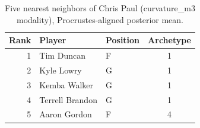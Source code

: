 \begin{table}[htbp]
  \centering\small
  \begin{tabular}{rllc}
    \toprule
    Rank & Player & Position & Archetype \\
    \midrule
    1 & Tim Duncan & F & 1 \\
    2 & Kyle Lowry & G & 1 \\
    3 & Kemba Walker & G & 1 \\
    4 & Terrell Brandon & G & 1 \\
    5 & Aaron Gordon & F & 4 \\
    \bottomrule
  \end{tabular}
  \caption{Five nearest neighbors of Chris Paul (curvature_m3 modality), Procrustes-aligned posterior mean.}
  \label{tab:Chris_Paul_neighbors_curvature_m3}
\end{table}

